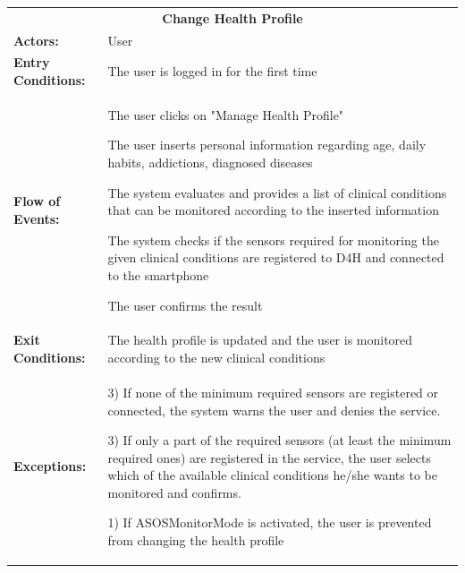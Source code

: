\begin{table}[H]
	\centering
	{\renewcommand{\arraystretch}{1.5}%
		\begin{tabular}{|@{\hspace{2em}} p{4cm} @{}| p{11cm} @{\qquad}|}
			\cline{1-2}
			\multicolumn{2}{|c|}{\textbf{Change Health Profile}} \\ \cline{1-2}
		   \textbf{Actors:} & User \\ \cline{1-2}
			\textbf{Entry Conditions:} & %
 The user is logged in for the first time \\ \cline{1-2}
			\textbf{Flow of Events:} & \begin{enumerate}[topsep=0em, itemsep=-0.2em]
				{\small \item  The user clicks on "Manage Health Profile"
				\item The user inserts personal information regarding age, daily habits, addictions, diagnosed diseases
				\item The system evaluates and provides a list of clinical conditions that can be monitored according to the inserted information
				\item The system checks if the sensors required for monitoring the given clinical conditions are registered to D4H and connected to the smartphone
				\item The user confirms the result }
			\end{enumerate} \\ \cline{1-2}
			\textbf{Exit Conditions:} & {\small The health profile is updated and the user is monitored according to the new clinical conditions} \\ \cline{1-2}
			\textbf{Exceptions:} & \begin{itemize}[topsep=0em, itemsep=-0.2em]
				{\small \item 3) If none of the minimum required sensors are registered or connected, the system warns the user and denies the service.
				\item 3) If only a part of the required sensors (at least the minimum required ones) are registered in the service, the user selects which of the available clinical conditions he/she wants to be monitored and confirms.
				\item 1) If ASOSMonitorMode is activated, the user is prevented from changing the health profile}
				\end{itemize}  \\ \cline{1-2}
	\end{tabular}} \quad
\end{table}

